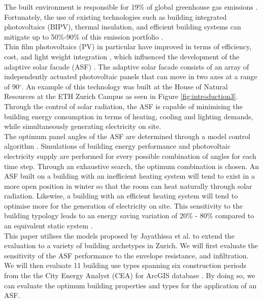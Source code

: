 
The built environment is responsible for 19\% of global greenhouse gas emissions \cite{IPCC}. Fortunately, the use of existing technologies such as building integrated photovoltaics (BIPV), thermal insulation, and efficient building systems can mitigate up to 50\%-90\% of this emission portfolio \cite{IPCC}.\\

Thin film photovoltaics (PV) in particular have improved in terms of efficiency, cost, and light weight integration \cite{NREL, kushiya2014cis, kaelin2004low, jelle2012building}, which influenced the development of the adaptive solar facade (ASF) \cite{nagy2016adaptive}. The adaptive solar facade consists of an array of independently actuated photovoltaic panels that can move in two axes at a range of 90$^{\circ}$. An example of this technology was built at the House of Natural Resources at the ETH Zurich Campus as seen in Figure \ref{fig:introduction3}. Through the control of solar radiation, the ASF is capable of minimising the building energy consumption in terms of heating, cooling and lighting demands, while simultaneously generating electricity on site.\\

The optimum panel angles of the ASF are determined through a model control algorithm \cite{jayathissa2017AE}. Simulations of building energy performance and photovoltaic electricity supply are performed for every possible combination of angles for each time step. Through an exhaustive search, the optimum combination is chosen. An ASF built on a  building with an inefficient heating system will tend to exist in a more open position in winter so that the room can heat naturally through solar radiation. Likewise, a building with an efficient heating system will tend to optimise more for the generation of electricity on site. This sensitivity to the building typology leads to an energy saving variation of 20\% - 80\% compared to an equivalent static system \cite{jayathissa2017AE} \cite{jayathissa2016PVSEC}. \\

This paper utilises the models proposed by Jayathissa et al. \cite{jayathissa2017AE} to extend the evaluation to a variety of building archetypes in Zurich. We will first evaluate the sensitivity of the ASF performance to the envelope resistance, and infiltration. We will then evaluate 11 building use types spanning six construction periods from the the City Energy Analyst (CEA) for ArcGIS database \cite{fonseca2016city}. By doing so, we can evaluate the optimum building properties and types for the application of an ASF. \\


